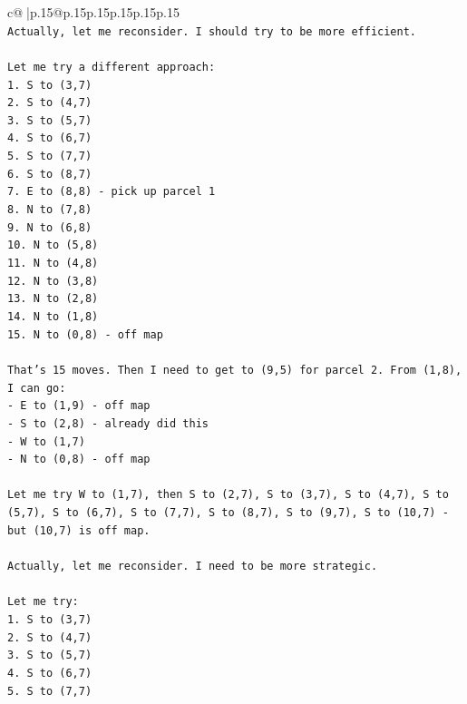 \documentclass{article}
\begin{document}
{\begin{supertabular}{c@{$\;$}|p{.15\linewidth}@{}p{.15\linewidth}p{.15\linewidth}p{.15\linewidth}p{.15\linewidth}p{.15\linewidth}}
{{{\\ 
\texttt{Actually, let me reconsider. I should try to be more efficient.} \\
\\ 
\texttt{Let me try a different approach:} \\
\texttt{1. S to (3,7)} \\
\texttt{2. S to (4,7)} \\
\texttt{3. S to (5,7)} \\
\texttt{4. S to (6,7)} \\
\texttt{5. S to (7,7)} \\
\texttt{6. S to (8,7)} \\
\texttt{7. E to (8,8) {-} pick up parcel 1} \\
\texttt{8. N to (7,8)} \\
\texttt{9. N to (6,8)} \\
\texttt{10. N to (5,8)} \\
\texttt{11. N to (4,8)} \\
\texttt{12. N to (3,8)} \\
\texttt{13. N to (2,8)} \\
\texttt{14. N to (1,8)} \\
\texttt{15. N to (0,8) {-} off map} \\
\\ 
\texttt{That's 15 moves. Then I need to get to (9,5) for parcel 2. From (1,8), I can go:} \\
\texttt{{-} E to (1,9) {-} off map} \\
\texttt{{-} S to (2,8) {-} already did this} \\
\texttt{{-} W to (1,7)} \\
\texttt{{-} N to (0,8) {-} off map} \\
\\ 
\texttt{Let me try W to (1,7), then S to (2,7), S to (3,7), S to (4,7), S to (5,7), S to (6,7), S to (7,7), S to (8,7), S to (9,7), S to (10,7) {-} but (10,7) is off map.} \\
\\ 
\texttt{Actually, let me reconsider. I need to be more strategic.} \\
\\ 
\texttt{Let me try:} \\
\texttt{1. S to (3,7)} \\
\texttt{2. S to (4,7)} \\
\texttt{3. S to (5,7)} \\
\texttt{4. S to (6,7)} \\
\texttt{5. S to (7,7)} \\
}}}
\end{supertabular}}
\end{document}
